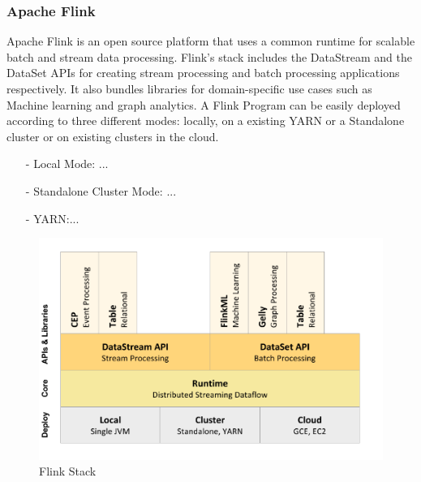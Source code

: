 \subsubsection{Apache Flink}
Apache Flink is an open source platform that uses a common runtime for scalable batch and stream data processing. Flink's stack includes the DataStream and the DataSet APIs for creating stream processing and batch processing applications respectively. It also bundles libraries for domain-specific use cases such as Machine learning and graph analytics. A Flink Program can be easily deployed according to three different modes: locally, on a existing YARN or a Standalone cluster or on existing clusters in the cloud.
\begin{itemize}
\item[-] Local Mode: ... \\
\item[-] Standalone Cluster Mode: ...\\
\item[-]YARN:... \\
\end{itemize}
				\begin{figure}[h!]
					\centering
					\includegraphics[scale=0.7]{graphics/Flink-Stack.PNG} 
					\caption{ Flink Stack \cite{a:BigData}} \label{flink} 
				\end{figure}


